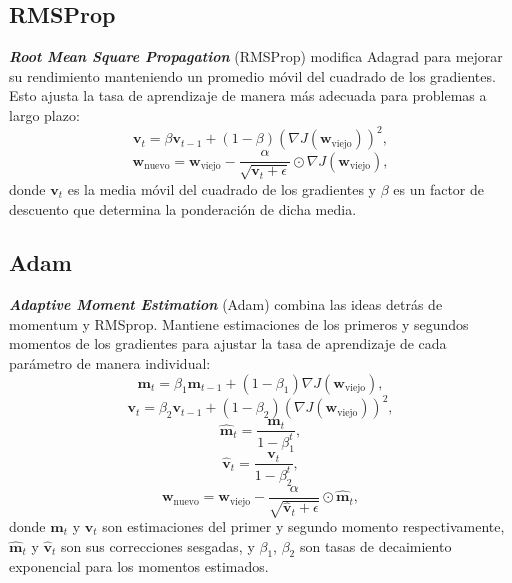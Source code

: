 \subsection{RMSProp}

\textbf{\textit{Root Mean Square Propagation}} (RMSProp) \cite{hinton2012lecture}
modifica Adagrad para mejorar su rendimiento manteniendo un promedio móvil del cuadrado
de los gradientes. Esto ajusta la tasa de aprendizaje de manera más adecuada
para problemas a largo plazo:
\begin{equation}
	\mathbf{v}_{t}= \beta \mathbf{v}_{t-1}+ (1 - \beta) (\nabla J(\mathbf{w}_{\text{viejo}}
	))^{2},
\end{equation}
\begin{equation}
	\mathbf{w}_{\text{nuevo}}= \mathbf{w}_{\text{viejo}}- \frac{\alpha}{\sqrt{\mathbf{v}_{t}+
			\epsilon}}\odot \nabla J(\mathbf{w}_{\text{viejo}}),
\end{equation}
donde $\mathbf{v}_{t}$ es la media móvil del cuadrado de los gradientes y $\beta$
es un factor de descuento que determina la ponderación de dicha media.

\subsection{Adam}

\textbf{\textit{Adaptive Moment Estimation}} (Adam) \cite{kingma2014adam} combina
las ideas detrás de momentum y RMSprop. Mantiene estimaciones de los primeros y
segundos momentos de los gradientes para ajustar la tasa de aprendizaje de cada
parámetro de manera individual:
\begin{equation}
	\mathbf{m}_{t}= \beta_{1} \mathbf{m}_{t-1}+ (1 - \beta_{1})\nabla J(\mathbf{w}_{\text{viejo}}
	),
\end{equation}
\begin{equation}
	\mathbf{v}_{t}= \beta_{2} \mathbf{v}_{t-1}+ (1 - \beta_{2})(\nabla J(\mathbf{w}
	_{\text{viejo}}))^{2},
\end{equation}
\begin{equation}
	\hat{\mathbf{m}}_{t}= \frac{\mathbf{m}_{t}}{1 - \beta_{1}^{t}},
\end{equation}
\begin{equation}
	\hat{\mathbf{v}}_{t}= \frac{\mathbf{v}_{t}}{1 - \beta_{2}^{t}},
\end{equation}
\begin{equation}
	\mathbf{w}_{\text{nuevo}}= \mathbf{w}_{\text{viejo}}- \frac{\alpha}{\sqrt{\hat{\mathbf{v}}_{t}+
			\epsilon}}\odot \hat{\mathbf{m}}_{t},
\end{equation}
donde $\mathbf{m}_{t}$ y $\mathbf{v}_{t}$ son estimaciones del primer y segundo momento
respectivamente, $\hat{\mathbf{m}}_{t}$ y $\hat{\mathbf{v}}_{t}$ son sus
correcciones sesgadas, y $\beta_{1}$, $\beta_{2}$ son tasas de decaimiento
exponencial para los momentos estimados.

